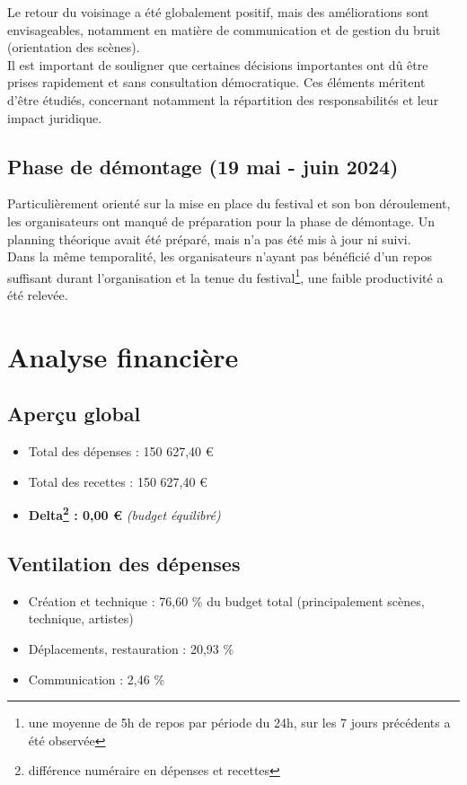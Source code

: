 \documentclass[12pt,a4paper]{report}
\begin{document}
Le retour du voisinage a été globalement positif, mais des améliorations sont envisageables, notamment en matière de communication et de gestion du bruit (orientation des scènes).\\

Il est important de souligner que certaines décisions importantes ont dû être prises rapidement et sans consultation démocratique. Ces éléments méritent d’être étudiés, concernant notamment la répartition des responsabilités et leur impact juridique.

\section{Phase de démontage (19 mai - juin 2024)}

Particulièrement orienté sur la mise en place du festival et son bon déroulement, les organisateurs ont manqué de préparation pour la phase de démontage. Un planning théorique avait été préparé, mais n'a pas été mis à jour ni suivi.\\

Dans la même temporalité, les organisateurs n'ayant pas bénéficié d'un repos suffisant durant l'organisation et la tenue du festival\footnote{une moyenne de 5h de repos par période du 24h, sur les 7 jours précédents a été observée}, une faible productivité a été relevée.

\chapter{Analyse financière}

\section{Aperçu global}
\begin{itemize}
\item Total des dépenses : 150 627,40 €
\item Total des recettes : 150 627,40 €
\item \textbf{Delta\footnote{différence numéraire en dépenses et recettes} : 0,00 €} \textit{(budget équilibré)}
\end{itemize}

\section{Ventilation des dépenses}
\begin{itemize}
\item Création et technique : 76,60 \% du budget total (principalement scènes, technique, artistes)
\item Déplacements, restauration : 20,93 \%
\item Communication : 2,46 \%
\end{itemize}
\end{document}
